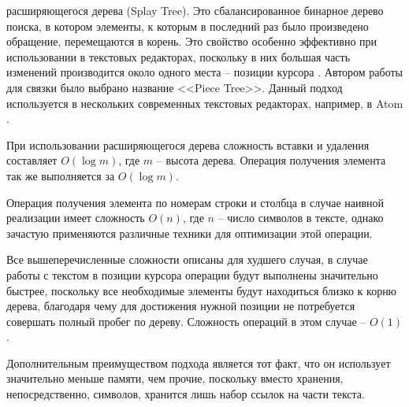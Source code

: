 \documentclass{fefu}
\begin{document}
				расширяющегося дерева (Splay Tree). Это сбалансированное бинарное дерево 
				поиска, в котором элементы, к которым в последний раз было произведено
				обращение, перемещаются в корень. Это свойство особенно эффективно при
				использовании в текстовых редакторах, поскольку в них большая часть изменений
				производится около одного места -- позиции курсора \cite{SplayTreeArticle}.
				Автором работы для связки было выбрано название <<Piece Tree>>. Данный подход
				используется в нескольких современных текстовых редакторах, например, в 
				Atom \cite{TextEditorsHabr}.
				\par При использовании расширяющегося дерева сложность вставки и удаления
				составляет $O(\log{m})$, где $m$ -- высота дерева. Операция получения
				элемента так же выполняется за $O(\log{m})$.
				\par Операция получения элемента по номерам строки и столбца в случае наивной
				реализации имеет сложность $O(n)$, где $n$ -- число символов в тексте, однако
				зачастую применяются различные техники для оптимизации этой операции.
				\par Все вышеперечисленные сложности описаны для худшего случая, в случае
				работы с текстом в позиции курсора операции будут выполнены значительно 
				быстрее, поскольку все необходимые элементы будут находиться близко к корню
				дерева, благодаря чему для достижения нужной позиции не потребуется совершать
				полный пробег по дереву. Сложность операций в этом случае -- $O(1)$.
				\par Дополнительным преимуществом подхода является тот факт, что он
				использует значительно меньше памяти, чем прочие, поскольку вместо хранения,
				непосредственно, символов, хранится лишь набор ссылок на части текста.
\end{document}
